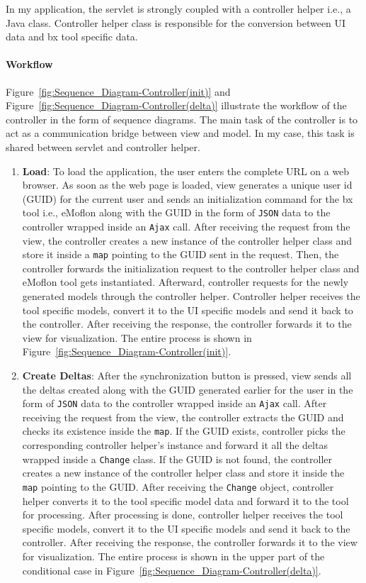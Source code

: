 In my application, the servlet is strongly coupled with a controller helper i.e., a Java class. Controller helper class is responsible for the conversion between UI data and bx tool specific data.

\paragraph{Workflow}
Figure~\ref{fig:Sequence_Diagram-Controller(init)} and Figure~\ref{fig:Sequence_Diagram-Controller(delta)} illustrate the workflow of the controller in the form of sequence diagrams. The main task of the controller is to act as a communication bridge between view and model. In my case, this task is shared between servlet and controller helper.

\begin{enumerate}
	\item {\textbf{Load}: To load the application, the user enters the complete URL on a web browser. As soon as the web page is loaded, view generates a unique user id (GUID) for the current user and sends an initialization command for the bx tool i.e., eMoflon along with the GUID in the form of \texttt{JSON} data to the controller wrapped inside an \texttt{Ajax} call. After receiving the request from the view, the controller creates a new instance of the controller helper class and store it inside a \texttt{map} pointing to the GUID sent in the request. Then, the controller forwards the initialization request to the controller helper class and eMoflon tool gets instantiated. Afterward, controller requests for the newly generated models through the controller helper. Controller helper receives the tool specific models, convert it to the UI specific models and send it back to the controller. After receiving the response, the controller forwards it to the view for visualization. The entire process is shown in Figure~\ref{fig:Sequence_Diagram-Controller(init)}.}
		
	\item {\textbf{Create Deltas}: After the synchronization button is pressed, view sends all the deltas created along with the GUID generated earlier for the user in the form of \texttt{JSON} data to the controller wrapped inside an \texttt{Ajax} call. After receiving the request from the view, the controller extracts the GUID and checks its existence inside the \texttt{map}. If the GUID exists, controller picks the corresponding controller helper's instance and forward it all the deltas wrapped inside a \texttt{Change} class. If the GUID is not found, the controller creates a new instance of the controller helper class and store it inside the \texttt{map} pointing to the GUID. After receiving the \texttt{Change} object, controller helper converts it to the tool specific model data and forward it to the tool for processing. After processing is done, controller helper receives the tool specific models, convert it to the UI specific models and send it back to the controller. After receiving the response, the controller forwards it to the view for visualization. The entire process is shown in the upper part of the conditional case in Figure~\ref{fig:Sequence_Diagram-Controller(delta)}.}
	

\end{enumerate}
